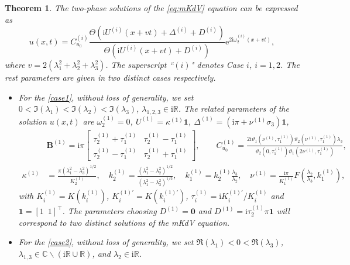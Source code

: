 \documentclass[11pt,reqno]{amsart}
\newcommand{\ii}{\mathrm{i}}
\newcommand{\ee}{\mathrm{e}}
\newtheorem{theorem}{Theorem}
\numberwithin{equation}{section}
\begin{document}
\begin{theorem}\label{theorem:solution-u}
	The two-phase solutions of the \ref{eq:mKdV} equation can be expressed as
	\begin{equation}\label{eq:solutions-dn}
		u(x,t)=C_{u_0}^{(i)}\frac{\Theta(\ii U^{(i)}(x+vt)+\Delta^{(i)}+D^{(i)})}{\Theta(\ii U^{(i)}(x+vt)+D^{(i)})}\ee^{2\ii \omega_{2}^{(i)}(x+vt)}, 
	\end{equation}
	where $v=2(\lambda_1^2+\lambda_2^2+\lambda_3^2)$.
	The superscript ``$(i)$" denotes Case $i$, $i = 1, 2$. 
	The rest parameters are given in two distinct cases respectively.
	\begin{itemize}
		\item For the \ref{case1}, without loss of generality, we set $0<\Im(\lambda_1)<\Im(\lambda_2)<\Im(\lambda_3)$, $\lambda_{1,2,3}\in \ii \mathbb{R}$. 
		The related parameters of the solution $u(x,t)$ are $\omega_{2}^{(1)}=0$, $	U^{(1)}=\kappa^{(1)}\mathbf{1}$, $\Delta^{(1)}=(\ii \pi+ \nu^{(1)}\sigma_3) \mathbf{1}$,
		\begin{subequations}\label{eq:u-parameters-dn}
			\begin{align}
			&
				\mathbf{B}^{(1)}=\ii \pi \begin{bmatrix}
					  \tau^{(1)}_2 + \tau^{(1)}_1 &   \tau^{(1)}_2 - \tau^{(1)}_1 \\[3pt]   \tau^{(1)}_2 - \tau^{(1)}_1 &   \tau^{(1)}_2 + \tau^{(1)}_1
				\end{bmatrix},
				\qquad
				C_{u_0}^{(1)}=\frac{2\ii \vartheta_1(\nu^{(1)},  \tau^{(1)}_1)\vartheta_2(\nu^{(1)},  \tau^{(1)}_1)\lambda_3}{\vartheta_2(0,  \tau^{(1)}_1)\vartheta_1(2 \nu^{(1)},  \tau^{(1)}_1)}, \label{eq:u-parameters-dn-B}\\
				\kappa^{(1)}&=\frac{\pi(\lambda_1^2-\lambda_3^2)^{1/2}}{  K^{(1)}_2}, \quad
				  k^{(1)}_2=\frac{(\lambda_1^2-\lambda_2^2)^{1/2}}{(\lambda_1^2-\lambda_3^2)^{1/2}}, \quad
				  k^{(1)}_1=   k^{(1)}_2\frac{\lambda_3}{\lambda_2}, \quad \nu^{(1)}=\frac{\ii \pi  }{  K^{(1)}_1}F\left(\frac{\lambda_2}{\lambda_3},  k^{(1)}_1\right),  \label{eq:u-parameters-dn-k}
			\end{align}
		\end{subequations} 
		with $K^{(1)}_i=K(k^{(1)}_i)$, $K^{{(1)}\prime}_i=K(k^{{(1)}\prime}_i)$, $\tau^{(1)}_i=\ii K^{{(1)}\prime}_i/K^{(1)}_i$ and $\mathbf{1}=[1 \,\,\, 1]^{\top}$.
		The parameters choosing $D^{(1)}=\mathbf{0}$ and $D^{(1)}=\ii   \tau^{(1)}_2\pi \mathbf{1}$ will correspond to two distinct solutions of the mKdV equation.
		\item For the \ref{case2}, without loss of generality, we set $\Re(\lambda_1)<0<\Re(\lambda_3)$, $\lambda_{1,3}\in \mathbb{C}\backslash(\ii \mathbb{R}\cup \mathbb{R})$, and $\lambda_2\in \ii \mathbb{R}$. 

\end{itemize}
\end{theorem}
\end{document}
